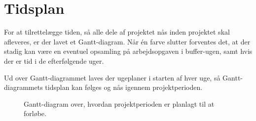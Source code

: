 \section{Tidsplan}
For at tilrettelægge tiden, så alle dele af projektet nås inden projektet skal afleveres, er der lavet et Gantt-diagram. 
Når én farve slutter forventes det, at der stadig kan være en eventuel opsamling på arbejdsopgaven i buffer-ugen, samt hvis der er tid i de efterfølgende uger. 

Ud over Gantt-diagrammet laves der ugeplaner i starten af hver uge, så Gantt-diagrammets tidsplan kan følges og nås igennem projektperioden.
 
\begin{figure}[H]
\centering
{}
\caption{Gantt-diagram over, hvordan projektperioden er planlagt til at forløbe.}
\label{fig:tidsplan}
\end{figure}